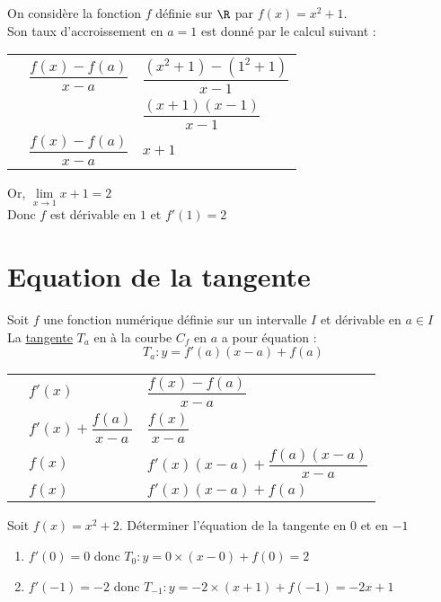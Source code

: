 \documentclass[12pt]{article}
\begin{document}
\begin{exemple}
On considère la fonction $f$ définie sur $\R$ par $f(x)=x^2+1$.\\
Son taux d'accroissement en $a=1$ est donné par le calcul suivant :
\begin{center}
  \begin{tabular}{p{0.3cm}l!{=}l}
    &  $\dfrac{f(x)-f(a)}{x-a}$ & $\dfrac{(x^2+1)-(1^2+1)}{x-1}$ \\
    & & $\dfrac{(x+1)(x-1)}{x-1}$ \\
    &   $\dfrac{f(x)-f(a)}{x-a}$ & $x+1$ \\
  \end{tabular}
\end{center}
Or, $\lim\limits_{x\to1}x+1=2$\\
Donc $f$ est dérivable en $1$ et $f'(1)=2$
\end{exemple}

\section{Equation de la tangente}

\begin{propriete}
   Soit $f$ une fonction numérique définie sur un intervalle $I$ et dérivable en $a\in I$\\
La \underline{tangente} $T_a$ en à la courbe $C_f$ en $a$ a pour équation :
$$T_a : y=f'(a)(x-a)+f(a)$$
\end{propriete}

\begin{demonstration}
\begin{center}
  \begin{tabular}{p{0.3cm}l!{=}l}
    &  $f'(x)$ & $\dfrac{f(x)-f(a)}{x-a}$ \\
    & $f'(x)+\dfrac{f(a)}{x-a}$& $\dfrac{f(x)}{x-a}$ \\
    &   $f(x)$ & $f'(x)(x-a)+\dfrac{f(a)(x-a)}{x-a}$ \\
    &   $f(x)$ & $f'(x)(x-a)+f(a)$ \\
  \end{tabular}
\end{center}
\end{demonstration}

\begin{exemple}
   Soit $f(x)=x^2+2$. Déterminer l'équation de la tangente en $0$ et en $-1$
   \begin{enumerate}
      \item $f'(0)=0$ donc $T_0 : y=0\times(x-0)+f(0)=2$
      \item $f'(-1)=-2$ donc $T_{-1} : y=-2\times(x+1)+f(-1)=-2x+1$
   \end{enumerate}
\end{exemple}
\end{document}
